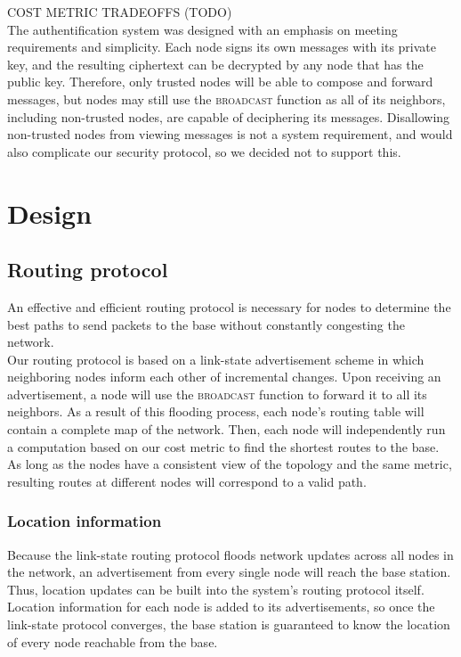 \documentclass[letterpaper]{article}
\begin{document}
\noindent COST METRIC TRADEOFFS (TODO)
\\

\noindent The authentification system was designed with an emphasis on meeting requirements and simplicity.
Each node signs its own messages with its private key, and the resulting ciphertext can be decrypted by any
node that has the public key. Therefore, only trusted nodes will be able to compose and forward messages, but
nodes may still use the \textsc{broadcast} function as all of its neighbors, including non-trusted nodes, are
capable of deciphering its messages. Disallowing non-trusted nodes from viewing messages is not a system 
requirement, and would also complicate our security protocol, so we decided not to support this.

\section{Design}

\subsection{Routing protocol}

An effective and efficient routing protocol is necessary for nodes to determine the best paths to send
packets to the base without constantly congesting the network.
\\

\noindent Our routing protocol is based on a link-state advertisement scheme in which neighboring nodes 
inform each other of incremental changes. Upon receiving an advertisement, a node will use the 
\textsc{broadcast} function to forward it to all its neighbors. As a result of this flooding process,
each node's routing table will contain a complete map of the network. Then, each node will independently
run a computation based on our cost metric to find the shortest routes to the base. As long as the nodes
have a consistent view of the topology and the same metric, resulting routes at different nodes will
correspond to a valid path.

\subsubsection{Location information}

\noindent Because the link-state routing protocol floods network updates across all nodes in the network,
an advertisement from every single node will reach the base station. Thus, location updates can be built 
into the system's routing protocol itself. Location information for each node is added to its 
advertisements, so once the link-state protocol converges, the base station is guaranteed to know the
location of every node reachable from the base.
\end{document}
